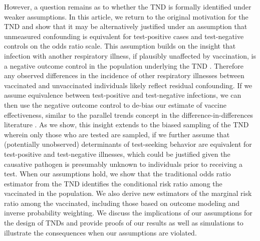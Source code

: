 \documentclass[11pt]{article}
\begin{document}
However, a question remains as to whether the TND is formally identified under weaker assumptions. In this article, we return to the original motivation for the TND and show that it may be alternatively justified under an assumption that unmeasured confounding is equivalent for test-positive cases and test-negative controls on the odds ratio scale. This assumption builds on the insight that infection with another respiratory illness, if plausibly unaffected by vaccination, is a negative outcome control in the population underlying the TND \cite{lipsitch_negative_2010,shi_selective_2020}. Therefore any observed differences in the incidence of other respiratory illnesses between vaccinated and unvaccinated individuals likely reflect residual confounding. If we assume equivalence between test-positive and test-negative infections, we can then use the negative outcome control to de-bias our estimate of vaccine effectiveness, similar to the parallel trends concept in the difference-in-differences literature \cite{sofer_negative_2016,park_universal_2023,tchetgen_universal_2023}. As we show, this insight extends to the biased sampling of the TND wherein only those who are tested are sampled, if we further assume that (potentially unobserved) determinants of test-seeking behavior are equivalent for test-positive and test-negative illnesses, which could be justified given the causative pathogen is presumably unknown to individuals prior to receiving a test. When our assumptions hold, we show that the traditional odds ratio estimator from the TND identifies the conditional risk ratio among the vaccinated in the population. We also derive new estimators of the marginal risk ratio among the vaccinated, including those based on outcome modeling and inverse probability weighting. We discuss the implications of our assumptions for the design of TNDs and provide proofs of our results as well as simulations to illustrate the consequences when our assumptions are violated.
\end{document}
